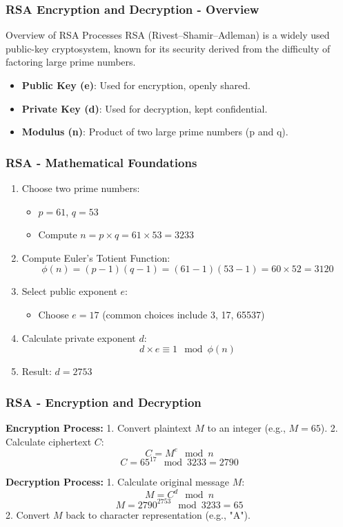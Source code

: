 \documentclass{beamer}
\begin{document}
\begin{frame}[fragile]
    \frametitle{RSA Encryption and Decryption - Overview}
    \begin{block}{Overview of RSA Processes}
        RSA (Rivest–Shamir–Adleman) is a widely used public-key cryptosystem, 
        known for its security derived from the difficulty of factoring large prime numbers.
    \end{block}
    
    \begin{itemize}
        \item \textbf{Public Key (e)}: Used for encryption, openly shared.
        \item \textbf{Private Key (d)}: Used for decryption, kept confidential.
        \item \textbf{Modulus (n)}: Product of two large prime numbers (p and q).
    \end{itemize}
\end{frame}

\begin{frame}[fragile]
    \frametitle{RSA - Mathematical Foundations}
    \begin{enumerate}
        \item Choose two prime numbers:
            \begin{itemize}
                \item \( p = 61 \), \( q = 53 \)
                \item Compute \( n = p \times q = 61 \times 53 = 3233 \)
            \end{itemize}
        \item Compute Euler's Totient Function:
            \[
            \phi(n) = (p-1)(q-1) = (61-1)(53-1) = 60 \times 52 = 3120
            \]
        \item Select public exponent \( e \):
            \begin{itemize}
                \item Choose \( e = 17 \) (common choices include 3, 17, 65537)
            \end{itemize}
        \item Calculate private exponent \( d \):
            \[
            d \times e \equiv 1 \mod \phi(n)
            \]
            \item Result: \( d = 2753 \)
    \end{enumerate}
\end{frame}

\begin{frame}[fragile]
    \frametitle{RSA - Encryption and Decryption}
    \textbf{Encryption Process:}
    1. Convert plaintext \( M \) to an integer (e.g., \( M = 65 \)).
    2. Calculate ciphertext \( C \):
    \[
    C = M^e \mod n
    \]
    \[
    C = 65^{17} \mod 3233 = 2790
    \]

    \textbf{Decryption Process:}
    1. Calculate original message \( M \):
    \[
    M = C^d \mod n
    \]
    \[
    M = 2790^{2753} \mod 3233 = 65
    \]
    2. Convert \( M \) back to character representation (e.g., "A").
\end{frame}
\end{document}
